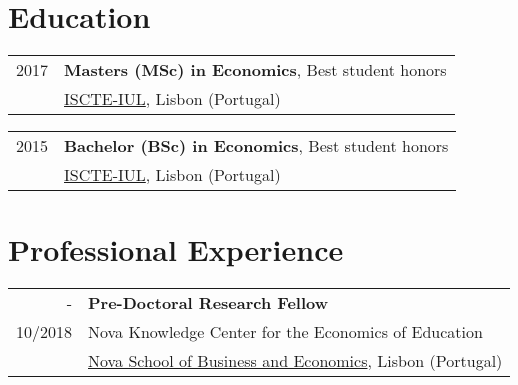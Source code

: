 \documentclass[a4paper,11pt]{article} %
\begin{document}
\section[Education]{\faGraduationCap \hspace{3pt} Education}

\begin{tabular}{r|p{15cm}}
	2017 & \textbf{Masters (MSc) in Economics}, Best student honors \\
	&  \href{https://iscte-iul.pt/}{ISCTE-IUL}, Lisbon (Portugal) \\
\end{tabular}

\begin{tabular}{r|p{15cm}}
	2015 & \textbf{Bachelor (BSc) in Economics}, Best student honors \\ & \href{https://iscte-iul.pt/}{ISCTE-IUL}, Lisbon (Portugal)\\
\end{tabular}

\section[Professional Experience]{\faBriefcase \hspace{3pt} Professional Experience}

\begin{tabular}{r|p{15cm}}
	- & \textbf{Pre-Doctoral Research Fellow} \\
	10/2018 & Nova Knowledge Center for the Economics of Education \\  & \href{https://www2.novasbe.unl.pt/en/}{Nova School of Business and Economics}, Lisbon (Portugal) \\ 
	
	
\end{tabular}
\end{document}
